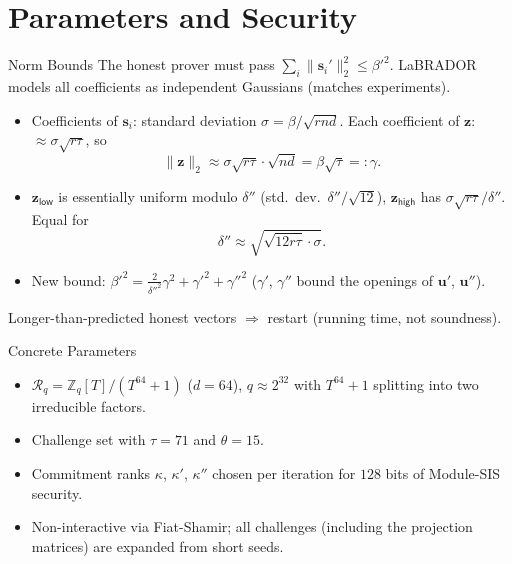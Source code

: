\documentclass{zkdl-presentation-template}
\begin{document}
    \section{Parameters and Security}

    \begin{frame}{Norm Bounds}
        The honest prover must pass $\sum_i \|\mathbf{s}_i'\|_2^2 \leq \beta'^2$. LaBRADOR models all coefficients as independent Gaussians (matches experiments).
        \pause
        \begin{itemize}
            \item Coefficients of $\mathbf{s}_i$: standard deviation $\sigma = \beta/\sqrt{rnd}$. Each coefficient of $\mathbf{z}$: $\approx \sigma\sqrt{r\tau}$, so
            \begin{equation*}
                \|\mathbf{z}\|_2 \approx \sigma\sqrt{r\tau}\cdot\sqrt{nd} = \beta\sqrt{\tau} =: \gamma.
            \end{equation*}\pause
            \vspace{-15pt}
            \item $\mathbf{z}_{\mathsf{low}}$ is essentially uniform modulo $\delta''$ (std.\ dev.\ $\delta''/\sqrt{12}$), $\mathbf{z}_{\mathsf{high}}$ has $\sigma\sqrt{r\tau}/\delta''$. Equal for
            \begin{equation*}
                \delta'' \approx \sqrt{\sqrt{12r\tau}\cdot \sigma}.
            \end{equation*}\pause
            \vspace{-15pt}
            \item New bound: $\beta'^2 = \frac{2}{\delta''^2}\gamma^2 + \gamma'^2 + \gamma''^2$ ($\gamma'$, $\gamma''$ bound the openings of $\mathbf{u}'$, $\mathbf{u}''$).
        \end{itemize}
        \pause
        Longer-than-predicted honest vectors $\Rightarrow$ restart (running time, not soundness).
    \end{frame}

    \begin{frame}{Concrete Parameters}
        \begin{itemize}
            \item $\mathcal{R}_q = \mathbb{Z}_q[T]/(T^{64}+1)$ ($d = 64$), $q \approx 2^{32}$ with $T^{64}+1$ splitting into two irreducible factors.\pause
            \item Challenge set with $\tau = 71$ and $\theta = 15$.\pause
            \item Commitment ranks $\kappa$, $\kappa'$, $\kappa''$ chosen per iteration for $128$ bits of Module-SIS security.\pause
            \item Non-interactive via Fiat-Shamir; all challenges (including the projection matrices) are expanded from short seeds.
        \end{itemize}
    \end{frame}
\end{document}
